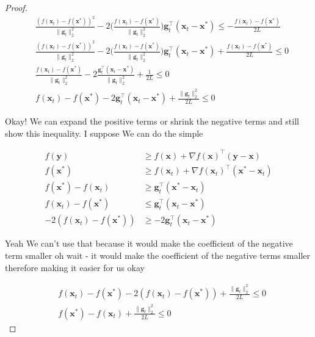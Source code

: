 \documentclass{article}
\begin{document}
\begin{proof}
	\begin{align}
		&\frac{(f(\mathbf{x}_t) - f(\mathbf{x}^*))^2}{\|\mathbf{g}_t\|^2_2} - 2 \bigg(\frac{f(\mathbf{x}_t) - f(\mathbf{x}^*)}{\|\mathbf{g}_t\|^2_2}\bigg)\mathbf{g}^\top_t(\mathbf{x}_t - \mathbf{x}^*) \le -\frac{f(\mathbf{x}_t) - f(\mathbf{x}^*)}{2L}\\
		&\frac{(f(\mathbf{x}_t) - f(\mathbf{x}^*))^2}{\|\mathbf{g}_t\|^2_2} - 2 \bigg(\frac{f(\mathbf{x}_t) - f(\mathbf{x}^*)}{\|\mathbf{g}_t\|^2_2}\bigg)\mathbf{g}^\top_t(\mathbf{x}_t - \mathbf{x}^*) +\frac{f(\mathbf{x}_t) - f(\mathbf{x}^*)}{2L} \le 0\\
		&\frac{f(\mathbf{x}_t) - f(\mathbf{x}^*)}{\|\mathbf{g}_t\|^2_2} - 2 \frac{\mathbf{g}^\top_t(\mathbf{x}_t - \mathbf{x}^*)}{\|\mathbf{g}_t\|^2_2} +\frac{1}{2L} \le 0\\
		&f(\mathbf{x}_t) - f(\mathbf{x}^*)  - 2 \mathbf{g}^\top_t(\mathbf{x}_t - \mathbf{x}^*) +\frac{\|\mathbf{g}_t\|^2_2}{2L} \le 0
	\end{align}
	
	Okay! We can expand the positive terms or shrink the negative terms and still show this inequality. I suppose We can do the simple
	
	\begin{align}
		f(\mathbf{y}) &\ge f(\mathbf{x}) + \nabla f(\mathbf{x})^\top(\mathbf{y}-\mathbf{x})\\
		f(\mathbf{x^*}) &\ge f(\mathbf{x}_t) + \nabla f(\mathbf{x}_t)^\top(\mathbf{x}^*-\mathbf{x}_t)\\
		f(\mathbf{x^*}) - f(\mathbf{x}_t) &\ge  \mathbf{g}_t^\top(\mathbf{x}^*-\mathbf{x}_t)\\
		 f(\mathbf{x}_t) - f(\mathbf{x^*}) &\le  \mathbf{g}_t^\top(\mathbf{x}_t - \mathbf{x}^*)\\
		 -2(f(\mathbf{x}_t) - f(\mathbf{x^*})) &\ge  -2\mathbf{g}_t^\top(\mathbf{x}_t - \mathbf{x}^*)
	\end{align}
	
	Yeah We can't use that because it would make the coefficient of the negative term smaller oh wait - it would make the coefficient of the negative terms smaller therefore making it easier for us okay
	
	\begin{align}
		&f(\mathbf{x}_t) - f(\mathbf{x}^*)  -2(f(\mathbf{x}_t) - f(\mathbf{x^*})) +\frac{\|\mathbf{g}_t\|^2_2}{2L} \le 0\\
		&  f(\mathbf{x^*}) - f(\mathbf{x}_t) +\frac{\|\mathbf{g}_t\|^2_2}{2L} \le 0
	\end{align}
	

\end{proof}
\end{document}
